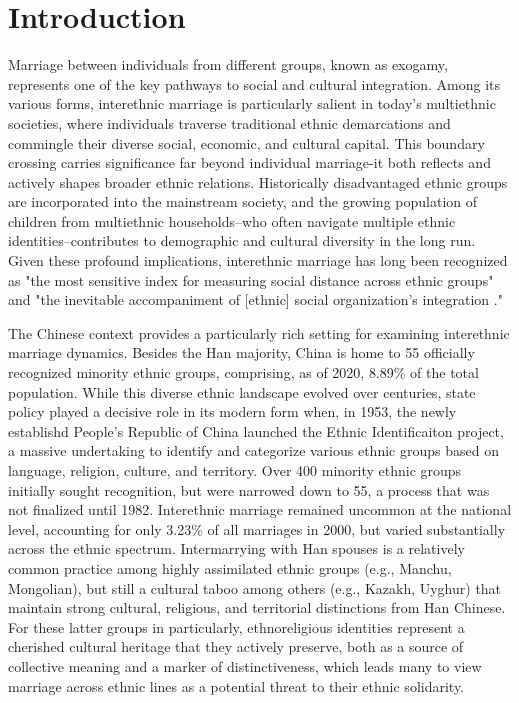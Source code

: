 \section{Introduction}

Marriage between individuals from different groups, known as exogamy,
represents one of the key pathways to social and cultural integration.
Among its various forms, interethnic marriage is particularly salient in
today's multiethnic societies,
where individuals traverse traditional ethnic demarcations and commingle their
diverse social, economic, and cultural capital.
This boundary crossing carries significance far beyond individual
marriage-it both reflects and actively shapes broader ethnic relations.
Historically disadvantaged ethnic groups are incorporated into the mainstream
society, and the growing population of children from multiethnic households--who
often navigate multiple ethnic identities--contributes to demographic and
cultural diversity in the long run.
Given these profound implications, interethnic marriage has long been recognized
as "the most sensitive index for measuring social distance across ethnic groups"
\cite{gordon_assimilation_1988} and "the inevitable accompaniment of [ethnic]
social organization's integration \cite{simpson_racial_1987}."

The Chinese context provides a particularly rich setting for examining
interethnic marriage dynamics.
Besides the Han majority, China is home to 55 officially recognized minority
ethnic groups, comprising, as of 2020, 8.89\% of the total population.
While this diverse ethnic landscape evolved over centuries, state policy played
a decisive role in its modern form when, in 1953, the newly establishd People's
Republic of China launched the Ethnic Identificaiton project, a massive
undertaking to identify and categorize various ethnic groups based on language,
religion, culture, and territory.
Over 400 minority ethnic groups initially sought recognition, but were narrowed
down to 55, a process that was not finalized until 1982.
Interethnic marriage remained uncommon at the national level, accounting for
only 3.23\% of all marriages in 2000, but varied substantially across the ethnic
spectrum.
Intermarrying with Han spouses is a relatively common practice among highly
assimilated ethnic groups (e.g., Manchu, Mongolian), but still a cultural taboo
among others (e.g., Kazakh, Uyghur) that maintain strong cultural, religious,
and territorial distinctions from Han Chinese.
For these latter groups in particularly, ethnoreligious identities represent a
cherished cultural heritage that they actively preserve, both as a source of
collective meaning and a marker of distinctiveness, which leads many to view
marriage across ethnic lines as a potential threat to their ethnic solidarity.

